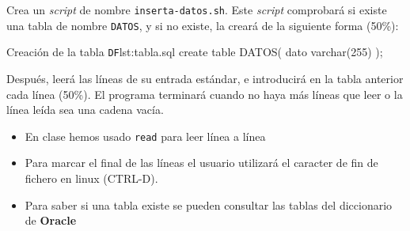 
\usepackage{eurosym}


\renewcommand{\hmwkClass}{Administración y gestión de bases de datos}
\renewcommand{\hmwkTitle}{Actividad extraordinaria \textit{scripts} de \textit{shell}}


\usepackage{blindtext}








\primerapagina

\begin{homeworkProblem}
  Crea un \textit{script} de nombre \texttt{inserta-datos.sh}. Este \textit{script} comprobará si existe una tabla de nombre \texttt{DATOS}, y si no existe, la creará de la siguiente forma (50\%):
  
  \begin{listadoshell}{Creación de la tabla \texttt{DF}}{lst:tabla.sql}
    create table DATOS(
      dato varchar(255)
    );
  \end{listadoshell}
  
  Después, leerá las líneas de su entrada estándar, e introducirá en la tabla anterior cada línea (50\%). El programa terminará cuando no haya más líneas que leer o la línea leída sea una cadena vacía.

  \begin{Aviso}[Ayuda]
    \begin{itemize}
    \item En clase hemos usado \texttt{read} para leer línea a línea
    \item Para marcar el final de las líneas el usuario utilizará el caracter de fin de fichero en linux (CTRL-D).
    \item Para saber si una tabla existe se pueden consultar las tablas del diccionario de \textbf{Oracle}  
    \end{itemize}
  \end{Aviso}
  
\end{homeworkProblem}

